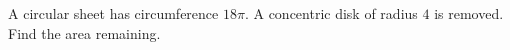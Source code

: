 A circular sheet has circumference $18\pi$. A concentric disk of radius $4$ is removed. Find the area remaining.

